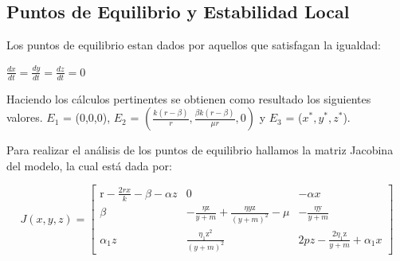 \documentclass{wscpaperproc}
\theoremstyle{wsc}
\begin{document}
\subsection{Puntos de Equilibrio y Estabilidad Local}
Los puntos de equilibrio estan dados por aquellos que satisfagan la igualdad:
\begin{center}
	$\frac{dx}{dt} = \frac{dy}{dt} = \frac{dz}{dt} = 0$
\end{center}
Haciendo los c\'alculos pertinentes se obtienen como resultado los siguientes valores.
$E_1$ = (0,0,0), $E_2$ = $(\frac{k(r-\beta)}{r}, \frac{\beta k(r-\beta)}{\mu r}, 0)$ y $E_3$ = ($x^*,y^*,z^*$).

Para realizar el análisis de los puntos de equilibrio hallamos la matriz Jacobina del modelo, la cual está dada por:

\begin{equation} \label{JacobianoEstability}
	J\left(x, y, z\right)=\left[\begin{array}{ccc}
			\mathrm{r}-\frac{2 r x}{k}-\beta-\alpha z & 0                                                                  & -\alpha x                                        \\
			\beta                                     & -\frac{\eta \mathrm{z}}{y+m}+\frac{\eta y \mathrm{z}}{(y+m)^2}-\mu & -\frac{\eta \mathrm{y}}{y+m}                     \\
			\alpha_1 z                                & \frac{\eta_1 \mathrm{z}^2}{(y+m)^2}                                & 2 p z-\frac{2 \eta_1 \mathrm{z}}{y+m}+\alpha_1 x
		\end{array}\right]
\end{equation}
\end{document}
